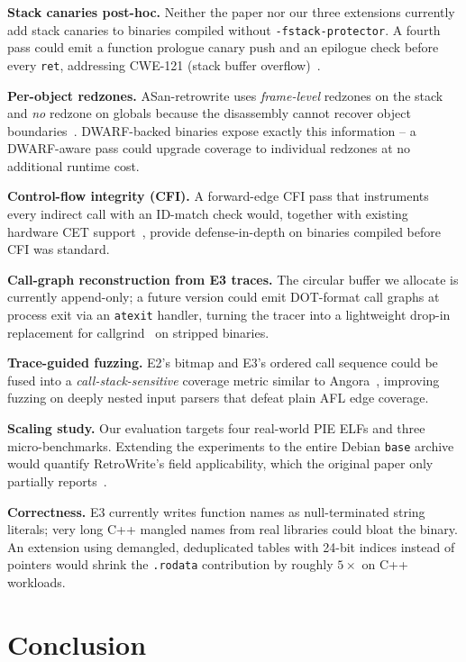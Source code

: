 \documentclass[10pt,a4paper]{article}
\begin{document}
\textbf{Stack canaries post-hoc.} Neither the paper nor our three extensions
currently add stack canaries to binaries compiled without
\texttt{-fstack-protector}. A fourth pass could emit a function prologue
canary push and an epilogue check before every \texttt{ret}, addressing
CWE-121 (stack buffer overflow)~\cite{cwe121}.

\textbf{Per-object redzones.} ASan-retrowrite uses \emph{frame-level}
redzones on the stack and \emph{no} redzone on globals because the
disassembly cannot recover object boundaries~\cite{retrowrite}. DWARF-backed
binaries expose exactly this information -- a DWARF-aware pass could upgrade
coverage to individual redzones at no additional runtime cost.

\textbf{Control-flow integrity (CFI).} A forward-edge CFI pass that
instruments every indirect call with an ID-match check would, together with
existing hardware CET support~\cite{cet}, provide defense-in-depth on
binaries compiled before CFI was standard.

\textbf{Call-graph reconstruction from E3 traces.} The circular buffer we
allocate is currently append-only; a future version could emit DOT-format
call graphs at process exit via an \texttt{atexit} handler, turning the
tracer into a lightweight drop-in replacement for callgrind~\cite{callgrind}
on stripped binaries.

\textbf{Trace-guided fuzzing.} E2's bitmap and E3's ordered call sequence
could be fused into a \emph{call-stack-sensitive} coverage metric similar to
Angora~\cite{angora}, improving fuzzing on deeply nested input parsers that
defeat plain AFL edge coverage.

\textbf{Scaling study.} Our evaluation targets four real-world PIE ELFs and
three micro-benchmarks. Extending the experiments to the entire Debian
\texttt{base} archive would quantify RetroWrite's field applicability, which
the original paper only partially reports~\cite{retrowrite}.

\textbf{Correctness.} E3 currently writes function names as null-terminated
string literals; very long C++ mangled names from real libraries could
bloat the binary. An extension using demangled, deduplicated tables with
24-bit indices instead of pointers would shrink the \texttt{.rodata}
contribution by roughly $5\times$ on C++ workloads.

\section{Conclusion}
\end{document}
